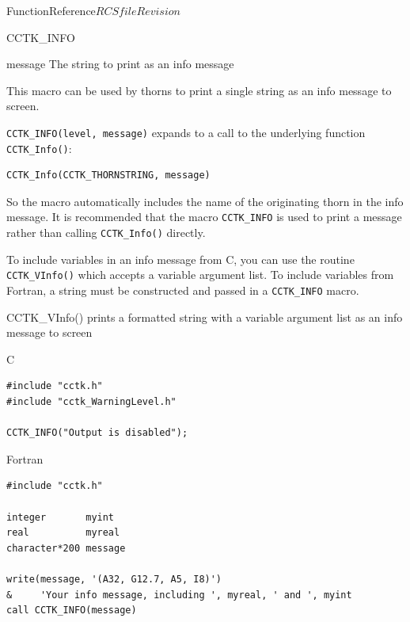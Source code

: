 \begin{cactuspart}{FunctionReference}{$RCSfile$}{$Revision$}
\begin{FunctionDescription}{CCTK\_INFO}
\begin{ParameterSection}
\begin{Parameter}{message}
The string to print as an info message
\end{Parameter}
\end{ParameterSection}

\begin{Discussion}
This macro can be used by thorns to print a single string as an info message
to screen.

{\tt CCTK\_INFO(level, message)} expands to a call to the underlying function
{\tt CCTK\_Info()}:

\begin{verbatim}
CCTK_Info(CCTK_THORNSTRING, message)
\end{verbatim}

So the macro automatically includes the name of the originating thorn in the
info message. It is recommended that the macro {\tt CCTK\_INFO} is used
to print a message rather than calling {\tt CCTK\_Info()} directly.

To include variables in an info message from C, you can use the routine
{\tt CCTK\_VInfo()} which accepts a variable argument list.
To include variables from Fortran, a string must be constructed and passed
in a {\tt CCTK\_INFO} macro.
\end{Discussion}

\begin{SeeAlsoSection}
\begin{SeeAlso}{CCTK\_VInfo()}
prints a formatted string with a variable argument list as an info message to
screen
\end{SeeAlso}
\end{SeeAlsoSection}

\begin{ExampleSection}
\begin{Example}{C}
\begin{verbatim}
#include "cctk.h"
#include "cctk_WarningLevel.h"

CCTK_INFO("Output is disabled");
\end{verbatim}
\end{Example}
\begin{Example}{Fortran}
\begin{verbatim}
#include "cctk.h"

integer       myint
real          myreal
character*200 message

write(message, '(A32, G12.7, A5, I8)')
&     'Your info message, including ', myreal, ' and ', myint
call CCTK_INFO(message)
\end{verbatim}
\end{Example}
\end{ExampleSection}
\end{FunctionDescription}


\end{cactuspart}
